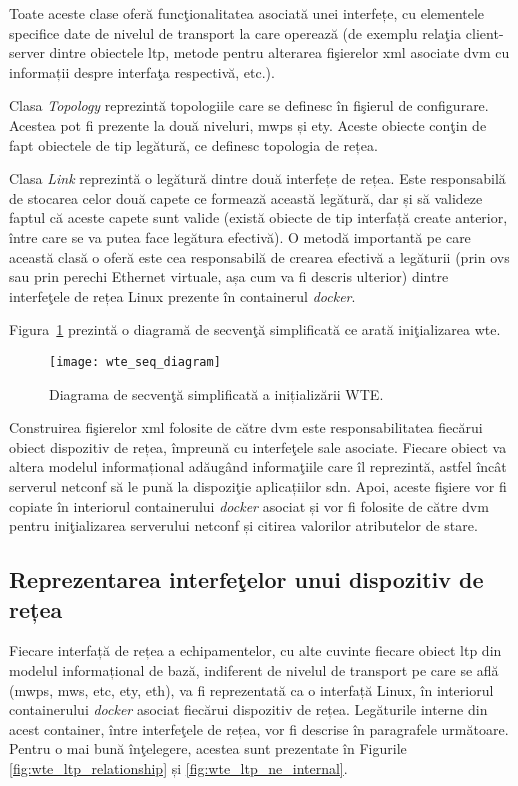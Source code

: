 Toate aceste clase oferă funcţionalitatea asociată unei interfețe, cu elementele specifice date de nivelul de transport la care operează (de exemplu relaţia client-server dintre obiectele \gls{ltp}, metode pentru alterarea fişierelor \gls{xml} asociate \gls{dvm} cu informații despre interfaţa respectivă, etc.).

Clasa \textit{Topology} reprezintă topologiile care se definesc în fişierul de configurare. Acestea pot fi prezente la două niveluri, \gls{mwps} și \gls{ety}. Aceste obiecte conţin de fapt obiectele de tip legătură, ce definesc topologia de rețea.

Clasa \textit{Link} reprezintă o legătură dintre două interfețe de rețea. Este responsabilă de stocarea celor două capete ce formează această legătură, dar și să valideze faptul că aceste capete sunt valide (există obiecte de tip interfață create anterior, între care se va putea face legătura efectivă). O metodă importantă pe care această clasă o oferă este cea responsabilă de crearea efectivă a legăturii (prin \gls{ovs} sau prin perechi Ethernet virtuale, așa cum va fi descris ulterior) dintre interfeţele de rețea Linux prezente în containerul \textit{docker}.

Figura~\ref{fig:wte_seq_diagram} prezintă o diagramă de secvenţă simplificată ce arată iniţializarea \gls{wte}.

\begin{figure}[h]
	\centering
	\texttt{[image: wte\_seq\_diagram]}
	\caption{Diagrama de secvenţă simplificată a inițializării WTE.}
	\label{fig:wte_seq_diagram}
\end{figure}

Construirea fişierelor \gls{xml} folosite de către \gls{dvm} este responsabilitatea fiecărui obiect dispozitiv de rețea, împreună cu interfeţele sale asociate. Fiecare obiect va altera modelul informațional adăugând informaţiile care îl reprezintă, astfel încât serverul \gls{netconf} să le pună la dispoziţie aplicațiilor \gls{sdn}. Apoi, aceste fişiere vor fi copiate în interiorul containerului \textit{docker} asociat și vor fi folosite de către \gls{dvm} pentru iniţializarea serverului \gls{netconf} și citirea valorilor atributelor de stare.

\subsection{Reprezentarea interfeţelor unui dispozitiv de rețea}

Fiecare interfață de rețea a echipamentelor, cu alte cuvinte fiecare obiect \gls{ltp} din modelul informațional de bază, indiferent de nivelul de transport pe care se află (\gls{mwps}, \gls{mws}, \gls{etc}, \gls{ety}, \gls{eth}), va fi reprezentată ca o interfață Linux, în interiorul containerului \textit{docker} asociat fiecărui dispozitiv de rețea. Legăturile interne din acest container, între interfeţele de rețea, vor fi descrise în paragrafele următoare. Pentru o mai bună înţelegere, acestea sunt prezentate în Figurile \ref{fig:wte_ltp_relationship} și \ref{fig:wte_ltp_ne_internal}.

